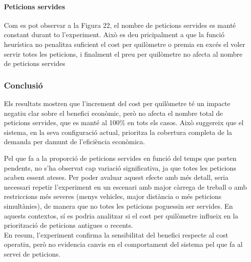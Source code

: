 \paragraph{Peticions servides}
Com es pot observar a la Figura 22, el nombre de peticions servides es manté constant durant to l'experiment. Això es deu pricipalment a que la funció heurística no penalitza suficient el cost per quilòmetre o premia en excés el voler servir totes les peticions, i finalment el preu per quilòmetre no afecta al nombre de peticions servides 


\vspace{0.5cm}


\subsubsection{Conclusió}
Els resultats mostren que l'increment del cost per quilòmetre té un impacte negatiu clar sobre el benefici econòmic, però no afecta el nombre total de peticions servides, que es manté al 100\% en tots els casos. Això suggereix que el sistema, en la seva configuració actual, prioritza la cobertura completa de la demanda per damunt de l’eficiència econòmica.
  
Pel que fa a la proporció de peticions servides en funció del temps que porten pendents, no s'ha observat cap variació significativa, ja que totes les peticions acaben essent ateses. Per poder avaluar aquest efecte amb més detall, seria necessari repetir l’experiment en un escenari amb major càrrega de treball o amb restriccions més severes (menys vehicles, major distància o més peticions simultànies), de manera que no totes les peticions poguessin ser servides. En aquests contextos, sí es podria analitzar si el cost per quilòmetre influeix en la priorització de peticions antigues o recents. \\

En resum, l'experiment confirma la sensibilitat del benefici respecte al cost operatiu, però no evidencia canvis en el comportament del sistema pel que fa al servei de peticions.